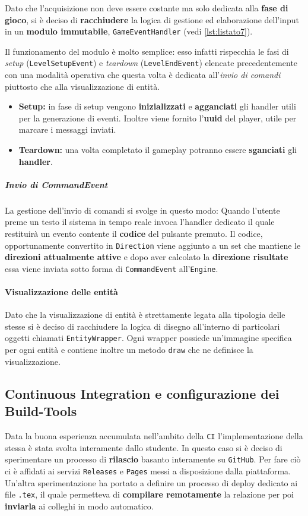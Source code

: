 Dato che l'acquisizione non deve essere costante ma solo dedicata alla \textbf{fase di gioco}, si è deciso di \textbf{racchiudere} la logica di gestione ed elaborazione dell'input in un \textbf{modulo immutabile}, \texttt{GameEventHandler} (vedi \ref{lst:listato7}).



Il funzionamento del modulo è molto semplice: esso infatti rispecchia le fasi di \textit{setup} (\texttt{LevelSetupEvent}) e \textit{teardown} (\texttt{LevelEndEvent}) elencate precedentemente con una modalità operativa che questa volta è dedicata all'\textit{invio di comandi} piuttosto che alla visualizzazione di entità.
\begin{itemize}
	\item{\textbf{Setup:}} in fase di setup vengono \textbf{inizializzati} e \textbf{agganciati} gli handler utili per la generazione di eventi. Inoltre viene fornito l'\textbf{uuid} del player, utile per marcare i messaggi inviati.
	\item{\textbf{Teardown:}} una volta completato il gameplay potranno essere \textbf{sganciati} gli \textbf{handler}.
\end{itemize}

\subparagraph{Invio di CommandEvent}
La gestione dell'invio di comandi si svolge in questo modo:
Quando l'utente preme un testo il sistema in tempo reale invoca l'handler dedicato il quale restituirà un evento contente il \textbf{codice} del pulsante premuto. Il codice, opportunamente convertito in \texttt{Direction} viene aggiunto a un set che mantiene le \textbf{direzioni attualmente attive} e dopo aver calcolato la \textbf{direzione risultate} essa viene inviata sotto forma di \texttt{CommandEvent} all'\texttt{Engine}.

\paragraph{Visualizzazione delle entità}
Dato che la visualizzazione di entità è strettamente legata alla tipologia delle stesse si è deciso di racchiudere la logica di disegno all'interno di particolari oggetti chiamati \texttt{EntityWrapper}. Ogni wrapper possiede un'immagine specifica per ogni entità e contiene inoltre un metodo \texttt{draw} che ne definisce la visualizzazione.

\subsection{Continuous Integration e configurazione dei Build-Tools}
\label{subsec:ci}
Data la buona esperienza accumulata nell'ambito della \texttt{CI} l'implementazione della stessa è stata svolta interamente dallo studente. In questo caso si è deciso di sperimentare un processo di \textbf{rilascio} basanto interamente su \texttt{GitHub}. Per fare ciò ci è affidati ai servizi \texttt{Releases} e \texttt{Pages} messi a disposizione dalla piattaforma. Un'altra sperimentazione ha portato a definire un processo di deploy dedicato ai file \texttt{.tex}, il quale permetteva di \textbf{compilare remotamente} la relazione per poi \textbf{inviarla} ai colleghi in modo automatico.

